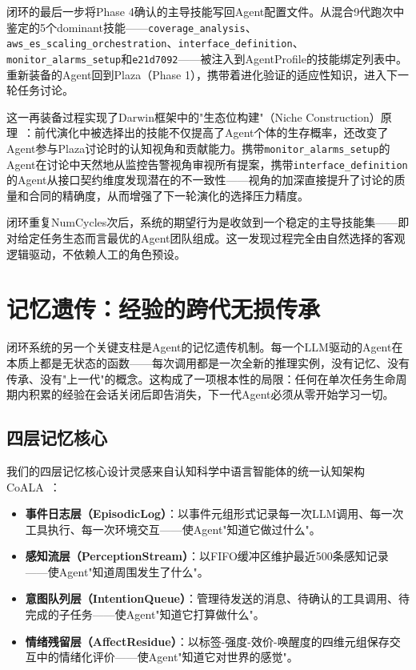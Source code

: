\documentclass[12pt,a4paper]{ctexart}
\begin{document}
闭环的最后一步将Phase 4确认的主导技能写回Agent配置文件。从混合9代跑次中鉴定的5个dominant技能——\texttt{coverage\_analysis}、\texttt{aws\_es\_scaling\_orchestration}、\texttt{interface\_definition}、\texttt{monitor\_alarms\_setup}和\texttt{e21d7092}——被注入到AgentProfile的技能绑定列表中。重新装备的Agent回到Plaza（Phase 1），携带着进化验证的适应性知识，进入下一轮任务讨论。

这一再装备过程实现了Darwin框架中的"生态位构建"（Niche Construction）原理~\cite{odling2003niche}：前代演化中被选择出的技能不仅提高了Agent个体的生存概率，还改变了Agent参与Plaza讨论时的认知视角和贡献能力。携带\texttt{monitor\_alarms\_setup}的Agent在讨论中天然地从监控告警视角审视所有提案，携带\texttt{interface\_definition}的Agent从接口契约维度发现潜在的不一致性——视角的加深直接提升了讨论的质量和合同的精确度，从而增强了下一轮演化的选择压力精度。

闭环重复NumCycles次后，系统的期望行为是收敛到一个稳定的主导技能集——即对给定任务生态而言最优的Agent团队组成。这一发现过程完全由自然选择的客观逻辑驱动，不依赖人工的角色预设。

\section{记忆遗传：经验的跨代无损传承}

闭环系统的另一个关键支柱是Agent的记忆遗传机制。每一个LLM驱动的Agent在本质上都是无状态的函数——每次调用都是一次全新的推理实例，没有记忆、没有传承、没有"上一代"的概念。这构成了一项根本性的局限：任何在单次任务生命周期内积累的经验在会话关闭后即告消失，下一代Agent必须从零开始学习一切。

\subsection{四层记忆核心}

我们的四层记忆核心设计灵感来自认知科学中语言智能体的统一认知架构CoALA~\cite{sumers2023coala}：

\begin{itemize}[nosep]
\item \textbf{事件日志层（EpisodicLog）}：以事件元组形式记录每一次LLM调用、每一次工具执行、每一次环境交互——使Agent"知道它做过什么"。
\item \textbf{感知流层（PerceptionStream）}：以FIFO缓冲区维护最近500条感知记录——使Agent"知道周围发生了什么"。
\item \textbf{意图队列层（IntentionQueue）}：管理待发送的消息、待确认的工具调用、待完成的子任务——使Agent"知道它打算做什么"。
\item \textbf{情绪残留层（AffectResidue）}：以标签-强度-效价-唤醒度的四维元组保存交互中的情绪化评价——使Agent"知道它对世界的感觉"。
\end{itemize}
\end{document}
